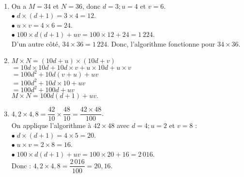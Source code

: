 \ \\ [-5mm]
   \begin{enumerate}
      \item On a $M =34$ et $N =36$, donc $d =3 ; u =4$ et $v =6$. \\
         $\bullet \; d\times(d+1) =3\times4 =12$. \\
         $\bullet \; u\times v =4\times6 =24$. \\
         $\bullet \; 100\times d(d+1)+uv =100\times12+24 =1\,224$. \\
         D'un autre côté, $34\times36 =1\,224$. Donc, {\blue l'algorithme fonctionne pour $34\times36$}.
      \item $M\times N =(10d+u)\times(10d+v)$ \\
         \hspace*{1.47cm} $=10d\times10d+10d\times v+u\times10d+u\times v$ \\
         \hspace*{1.47cm} $=100d^2+10d(v+u)+uv$ \\
         \hspace*{1.47cm} $=100d^2+10d\times10+uv$ \\
         \hspace*{1.47cm} $=100d^2+100d+uv$ \\
         \hspace*{0.36cm} {\blue $M\times N =100d(d+1)+uv.$} \smallskip
      \item $4,2\times4,8 =\dfrac{42}{10}\times\dfrac{48}{10} =\dfrac{42\times48}{100}$. \\ [1mm]
         On applique l'algorithme à $42\times48$ avec $d =4 ; u =2$ et $v =8$ : \\
         $\bullet \; d\times(d+1) =4\times5 =20$. \\
         $\bullet \; u\times v =2\times8 =16$. \\
         $\bullet \; 100\times d(d+1)+uv =100\times20+16 =2\,016$. \\ [1mm]
         Donc : {\blue $4,2\times4,8 =\dfrac{2\,016}{100} =20,16$}.
      \end{enumerate}
